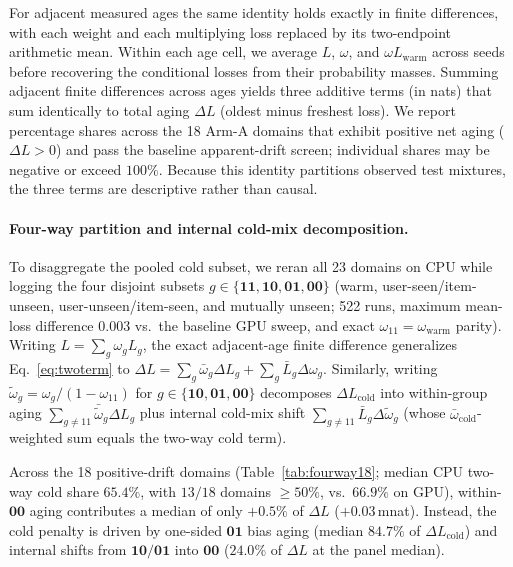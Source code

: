 \documentclass[10pt,letterpaper]{article}
\begin{document}
For adjacent measured ages the same identity holds exactly in finite
differences, with each weight and each multiplying loss replaced by its
two-endpoint arithmetic mean. Within each age cell, we average $L$, $\omega$,
and $\omega L_{\mathrm{warm}}$ across seeds before recovering the conditional
losses from their probability masses. Summing adjacent finite differences
across ages yields three additive terms (in nats) that sum identically to total
aging $\Delta L$ (oldest minus freshest loss). We report percentage shares
across the 18 Arm-A domains that exhibit positive net aging ($\Delta L > 0$) and
pass the baseline apparent-drift screen; individual shares may be negative or
exceed $100\%$. Because this identity partitions observed test mixtures, the
three terms are descriptive rather than causal.

\paragraph{Four-way partition and internal cold-mix decomposition.}
To disaggregate the pooled cold subset, we reran all 23 domains on CPU while
logging the four disjoint subsets $g \in \{\mathbf{11}, \mathbf{10},
\mathbf{01}, \mathbf{00}\}$ (warm, user-seen/item-unseen, user-unseen/item-seen,
and mutually unseen; 522 runs, maximum mean-loss difference $0.003$ vs.\ the
baseline GPU sweep, and exact $\omega_{11} = \omega_{\mathrm{warm}}$ parity).
Writing $L = \sum_g \omega_g L_g$, the exact adjacent-age finite difference
generalizes Eq.~\eqref{eq:twoterm} to $\Delta L = \sum_g \bar\omega_g \Delta L_g +
\sum_g \bar L_g \Delta\omega_g$. Similarly, writing $\tilde\omega_g =
\omega_g / (1 - \omega_{11})$ for $g \in \{\mathbf{10}, \mathbf{01}, \mathbf{00}\}$
decomposes $\Delta L_{\mathrm{cold}}$ into within-group aging
$\sum_{g \neq 11} \bar{\tilde\omega}_g \Delta L_g$ plus internal cold-mix shift
$\sum_{g \neq 11} \bar L_g \Delta\tilde\omega_g$ (whose $\bar\omega_{\mathrm{cold}}$-weighted
sum equals the two-way cold term).

Across the 18 positive-drift domains (Table~\ref{tab:fourway18}; median CPU
two-way cold share $65.4\%$, with $13/18$ domains $\ge 50\%$, vs.\ $66.9\%$ on
GPU), within-$\mathbf{00}$ aging contributes a median of only $+0.5\%$ of
$\Delta L$ ($+0.03$\,mnat). Instead, the cold penalty is driven by one-sided
$\mathbf{01}$ bias aging (median $84.7\%$ of $\Delta L_{\mathrm{cold}}$) and
internal shifts from $\mathbf{10}/\mathbf{01}$ into $\mathbf{00}$ ($24.0\%$ of
$\Delta L$ at the panel median).
\end{document}
